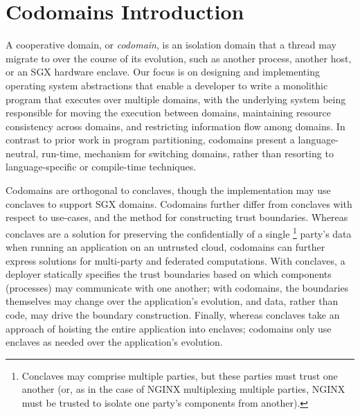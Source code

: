 \section{Codomains Introduction}
\label{sec:codomains-intro}

A cooperative domain, or \emph{codomain}, is an isolation domain
that a thread may migrate to over the course of its evolution, such as another
process, another host, or an SGX hardware enclave.
%
Our focus is on designing and implementing operating system abstractions that
enable a developer to write a monolithic program that executes over multiple
domains, with the underlying system being responsible for moving the execution
between domains, maintaining resource consistency across domains, and
restricting information flow among domains.
%
In contrast to prior work in program partitioning, codomains present
a language-neutral, run-time, mechanism for switching domains, rather than
resorting to language-specific or compile-time techniques.



Codomains are orthogonal to conclaves, though the implementation may
use conclaves to support SGX domains.
%
Codomains further differ from conclaves with respect to use-cases, and the
method for constructing trust boundaries.
%
Whereas conclaves are a solution for preserving the confidentially of a single
\footnote{
Conclaves may comprise
multiple parties, but these parties must trust one another (or, as in
the case of NGINX multiplexing multiple parties, NGINX must be trusted
to isolate one party's components from another).
}
party's data when running an application on an untrusted cloud,
%
codomains can further express solutions for multi-party and
federated computations.
%
With conclaves, a deployer statically specifies the trust boundaries based on
which components (processes) may communicate with one another;
%
%
with codomains, the boundaries themselves may change over
the application's evolution, and data, rather than code, may drive the boundary
construction.
%
Finally, whereas conclaves take an approach of hoisting the entire application
into enclaves; codomains only use enclaves as needed over the application's
evolution.







